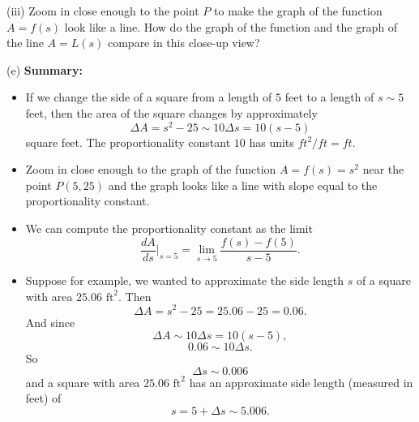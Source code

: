 \documentclass{ximera}
\begin{document}
\begin{question}
(iii) Zoom in close enough to the point $P$ to make the graph of the function $A=f(s)$ look like a line. How do the graph of the function and the graph of the line $A=L(s)$ compare in this close-up view?
\begin{freeResponse}
\end{freeResponse}

(e) {\bf Summary:}
\begin{itemize}
\item{If we change the side of a square from a length of $5$ feet to a length of $s\sim 5$ feet, then the area of the square changes by approximately
\[
 \Delta A = s^2-25  \sim 10 \Delta s = 10 (s-5)
\]
square feet. The proportionality constant $10$ has units $ft^2/ft = ft$.
}

\item{Zoom in close enough to the graph of the function $A=f(s)=s^2$ near the point $P(5,25)$ and the graph looks like a line with slope equal to the proportionality constant.}

\item{We can compute the proportionality constant as the limit
\[
    \frac{dA}{ds}\Big|_{s=5} = \lim_{s\to 5} \frac{f(s)-f(5)}{s-5} . 
\]
}

\item{Suppose for example, we wanted to approximate the side length $s$ of a square with area $25.06\text{ ft}^2$. Then 
\[ 
         \Delta A = s^2 - 25 = 25.06 - 25 = 0.06 .
\]
And since
\[
   \Delta A \sim 10 \Delta s = 10(s-5), 
\]
\[
          0.06 \sim 10\Delta s .
\]
So
\[
  \Delta s \sim 0.006
\]
and a square with area $25.06 \text{ ft}^2$ has an approximate side length (measured in feet) of
\[
    s = 5 + \Delta s \sim 5.006.
\]
}

\end{itemize}



\end{question}
\end{document}
